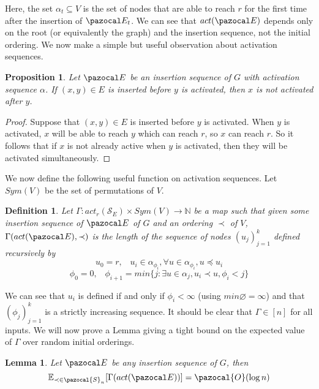 \documentclass{article}
\newtheorem{lemma}[theorem]{Lemma}
\newtheorem{proposition}[theorem]{Proposition}
\newtheorem{definition}[theorem]{Definition}
\begin{document}
Here, the set $\alpha_t \subseteq V$ is the set of nodes that are able to reach $r$ for the first time after the insertion of $\pazocal E_t$. We can see that $act(\pazocal E)$ depends only on the root (or equivalently the graph) and the insertion sequence, not the initial ordering. We now make a simple but useful observation about activation sequences.

\begin{proposition}
Let $\pazocal E$ be an insertion sequence of $G$ with activation sequence $\alpha$. If $(x,y) \in E$ is inserted before $y$ is activated, then $x$ is not activated after $y$.
\end{proposition}

\begin{proof}
Suppose that $(x,y) \in E$ is inserted before $y$ is activated. When $y$ is activated, $x$ will be able to reach $y$ which can reach $r$, so $x$ can reach $r$. So it follows that if $x$ is not already active when $y$ is activated, then they will be activated simultaneously.
\end{proof}

We now define the following useful function on activation sequences. Let $Sym(V)$ be the set of permutations of $V$.

\begin{definition}
Let $\Gamma : act_r(\mathcal{S}_{E}) \times Sym(V) \longrightarrow \mathbb{N}$ be a map such that given some insertion sequence of $\pazocal E$ of $G$ and an ordering $\prec$ of $V$, $\Gamma(act(\pazocal E), \prec)$ is the length of the sequence of nodes $(u_j)_{j=1}^k$ defined recursively by
\[ u_0 = r, \;\;\; u_i \in \alpha_{\phi_i},\forall u \in \alpha_{\phi_i}, u \preccurlyeq u_i \]
\[ \phi_0 = 0, \;\;\; \phi_{i+1} = min\{j : \exists u \in \alpha_j, u_i \prec u, \phi_i < j\} \]
\end{definition}

We can see that $u_i$ is defined if and only if $\phi_i < \infty$ (using $min \varnothing = \infty$) and that $(\phi_j)_{j=1}^k$ is a strictly increasing sequence. It should be clear that $\Gamma \in [n]$ for all inputs. We will now prove a Lemma giving a tight bound on the expected value of $\Gamma$ over random initial orderings.

\begin{lemma}
Let $\pazocal E$ be any insertion sequence of $G$, then
\[ \mathbb{E}_{\prec \in \pazocal{S}_n}[\Gamma(act(\pazocal E))] = \pazocal{O}(\log n) \]
\end{lemma}
\end{document}
